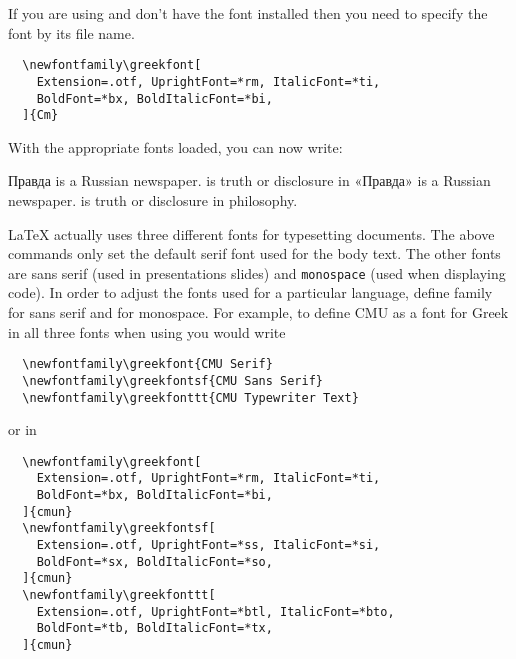 If you are using  and don't have the font installed then you
need to specify the font by its file name.
\begin{verbatim}
  \newfontfamily\greekfont[
    Extension=.otf, UprightFont=*rm, ItalicFont=*ti,
    BoldFont=*bx, BoldItalicFont=*bi,
  ]{Cm}
\end{verbatim}

With the appropriate fonts loaded, you can now write:
\begin{example}[examplewidth=0.8\linewidth, vertical_mode,noextend]
\newfontfamily{}
\newfontfamily{}

\begin{chktexignore} %
\textrussian{Правда} is a Russian newspaper. %
 is truth or disclosure in %
\textrussian{«Правда»} is a Russian newspaper.
 is truth or disclosure in
philosophy.
\end{chktexignore} %
\end{example}

\LaTeX{} actually uses three different fonts for typesetting documents. The
above commands only set the default serif font used for the body text. The
other fonts are \textsf{sans serif} (used in presentations slides) and
\texttt{monospace} (used when displaying code). In order to adjust the fonts used for
a particular language, define  family for sans serif and
 for monospace. For example, to define CMU as a
font for Greek in all three fonts when using  you would write
\begin{verbatim}
  \newfontfamily\greekfont{CMU Serif}
  \newfontfamily\greekfontsf{CMU Sans Serif}
  \newfontfamily\greekfonttt{CMU Typewriter Text}
\end{verbatim}
\pagebreak[3]
or in 
\begin{verbatim}
  \newfontfamily\greekfont[
    Extension=.otf, UprightFont=*rm, ItalicFont=*ti,
    BoldFont=*bx, BoldItalicFont=*bi,
  ]{cmun}
  \newfontfamily\greekfontsf[
    Extension=.otf, UprightFont=*ss, ItalicFont=*si,
    BoldFont=*sx, BoldItalicFont=*so, 
  ]{cmun}
  \newfontfamily\greekfonttt[
    Extension=.otf, UprightFont=*btl, ItalicFont=*bto,
    BoldFont=*tb, BoldItalicFont=*tx, 
  ]{cmun}
\end{verbatim}

